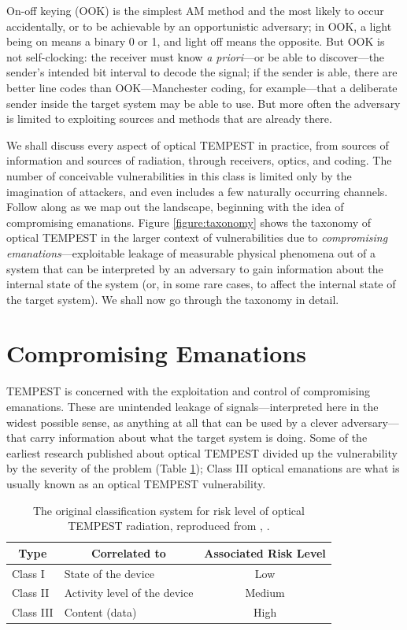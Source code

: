 \documentclass[a4paper,twoside,11pt,openany]{book}
\begin{document}
On-off keying (OOK) is the simplest AM method and the most likely to occur
accidentally, or to be achievable by an opportunistic adversary; in OOK, a
light being on means a binary 0 or 1, and light
off means the opposite. But OOK is not self-clocking: the receiver must
know {\it a priori}---or be able to discover---the sender's intended bit
interval to decode the signal; if the sender is able, there are better line
codes than OOK---Manchester coding, for example---that a deliberate sender
inside the target system may be able to use. But more often the adversary is
limited to exploiting sources and methods that are already there.

We shall discuss every aspect of optical TEMPEST in practice, from sources of
information and sources of radiation, through receivers, optics, and coding.
The number of conceivable vulnerabilities in this class is limited only by the
imagination of attackers, and even includes a few naturally occurring channels.
Follow along as we map out the landscape, beginning with the idea of
compromising emanations.
Figure \ref{figure:taxonomy} shows the taxonomy of optical TEMPEST in the
larger context of vulnerabilities due to \emph{compromising
emanations}---exploitable leakage of measurable physical phenomena out of a
system that can be interpreted by an adversary to gain information about the
internal state of the system (or, in some rare cases, to affect the internal
state of the target system). We shall now go through the taxonomy in detail.
\section{Compromising Emanations}
TEMPEST is concerned with the exploitation and control of compromising
emanations. These are unintended leakage of signals---interpreted here in the
widest possible sense, as anything at all that can be used by a clever
adversary---that carry information about what the target system is doing. Some
of the earliest research published about optical TEMPEST divided up the
vulnerability by the severity of the problem (Table \ref{table:class_III});
Class III optical emanations are what is usually known as an optical TEMPEST
vulnerability.

\begin{table}[ht]
\caption{The original classification system for risk level of optical TEMPEST
radiation, reproduced from \citeauthor{Loughry2002a}, \citeyear{Loughry2002a}.}
\medskip
\label{table:class_III}
\centering
\begin{tabular}{|l|l|c|}
\hline
\multicolumn{1}{|c|}{Type} & \multicolumn{1}{|c|}{Correlated to}
  & Associated Risk Level \bigstrut \\
\hline
\renewcommand{\arraystretch}{1}
Class I & State of the device & Low \\
Class II & Activity level of the device & Medium \\
Class III & Content (data) & High \\
\hline
\end{tabular}
\end{table}
\end{document}
